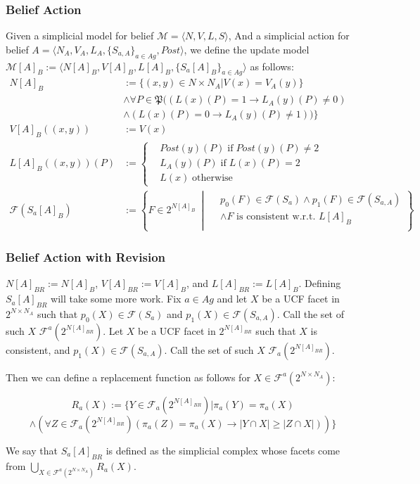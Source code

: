 \documentclass{beamer}
\begin{document}
\begin{frame}[fragile]
	\frametitle{Belief Action}
	\begin{definition}
		Given a simplicial model for belief $\mathcal{M}=\langle N,V,L,S\rangle$, And a simplicial action for belief $A=\langle N_A,V_A,L_A,\{S_{a,A}\}_{a\in Ag},Post\rangle$, we define the update model $\mathcal{M}[A]_B:=\langle N[A]_B,V[A]_B,L[A]_B,\{S_a[A]_B\}_{a\in Ag}\rangle$ as follows:
		\begin{align*}
			N[A]_B&:=\{(x,y)\in N\times N_A|V(x)=V_A(y)\}\\
			&\wedge\forall P\in\mathfrak{P}((L(x)(P)=1\rightarrow L_A(y)(P)\neq 0)\\
			&\wedge(L(x)(P)=0\rightarrow L_A(y)(P)\neq 1))\}
			\\ V[A]_B((x,y))&:=V(x)
			\\ L[A]_B((x,y))(P)&:=\begin{cases}
				& Post(y)(P)\;\text{if}\;Post(y)(P)\neq 2 \\
				& L_A(y)(P)\;\text{if}\;L(x)(P)=2 \\
				&L(x)\;\text{otherwise}
			\end{cases} 
			\\ \mathcal{F}(S_a[A]_B)&:=\left \{F\in 2^{N[A]_B}~\middle |~\begin{matrix}
				& p_0(F)\in\mathcal{F}(S_a)\wedge p_1(F)\in\mathcal{F}(S_{a,A}) \\
				& \wedge F\text{ is consistent w.r.t. }L[A]_B \\
			\end{matrix} \right \}
		\end{align*}
	\end{definition}
\end{frame}

\begin{frame}[fragile]
	\frametitle{Belief Action with Revision}
	\begin{definition} $N[A]_{BR}:=N[A]_B$, $V[A]_{BR}:=V[A]_B$, and $L[A]_{BR}:=L[A]_B$. Defining $S_a[A]_{BR}$ will take some more work. Fix $a\in Ag$ and let $X$ be a UCF facet in $2^{N\times N_A}$ such that $p_0(X)\in\mathcal{F}(S_a)$ and $p_1(X)\in\mathcal{F}(S_{a,A})$. Call the set of such $X$ $\mathcal{F}^a(2^{N[A]_{BR}})$. Let $X$ be a UCF facet in $2^{N[A]_{BR}}$ such that $X$ is consistent, and $p_1(X)\in\mathcal{F}(S_{a,A})$. Call the set of such $X$ $\mathcal{F}_a(2^{N[A]_{BR}})$. 
		
		Then we can define a replacement function as follows for $X\in\mathcal{F}^a(2^{N\times N_A})$:
		
		$$R_a(X):=\{Y\in\mathcal{F}_a(2^{N[A]_{BR}})|\pi_a(Y)=\pi_a(X)$$
		$$\wedge(\forall Z\in\mathcal{F}_a(2^{N[A]_{BR}})(\pi_a(Z)=\pi_a(X)\rightarrow|Y\cap X|\geq|Z\cap X|))\}$$
		
		We say that $S_a[A]_{BR}$ is defined as the simplicial complex whose facets come from $\bigcup_{X\in\mathcal{F}^a(2^{N\times N_A})}R_a(X)$.
	\end{definition}
\end{frame}
\end{document}
